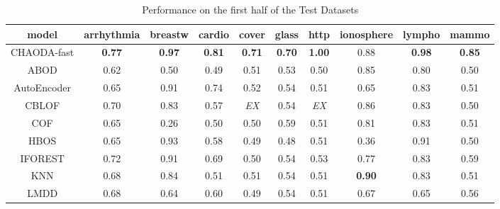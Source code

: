 \begin{table*}[!t]
\renewcommand{\arraystretch}{1.25}
\caption{Performance on the first half of the Test Datasets}
\label{table:results:test-performance-1}
\centering
\begin{tabular}{|c|c|c|c|c|c|c|c|c|c|}
\hline
\textbf{model} & \textbf{arrhythmia} & \textbf{breastw} & \textbf{cardio} & \textbf{cover} & \textbf{glass} & \textbf{http} & \textbf{ionosphere} & \textbf{lympho} & \textbf{mammo} \\
\hline
    CHAODA-fast &       \textbf{0.77} &    \textbf{0.97} &   \textbf{0.81} &  \textbf{0.71} &  \textbf{0.70} & \textbf{1.00} &                0.88 &   \textbf{0.98} &  \textbf{0.85} \\
\hline
            ABOD &                0.62 &             0.50 &            0.49 &           0.51 &           0.53 &          0.50 &                0.85 &            0.80 &           0.50 \\
\hline
    AutoEncoder &                0.65 &             0.91 &            0.74 &           0.52 &           0.54 &          0.51 &                0.65 &            0.83 &           0.51 \\
\hline
            CBLOF &                0.70 &             0.83 &            0.57 &    \textit{EX} &           0.54 &   \textit{EX} &                0.86 &            0.83 &           0.50 \\
\hline
            COF &                0.65 &             0.26 &            0.50 &           0.50 &           0.59 &          0.51 &                0.81 &            0.83 &           0.51 \\
\hline
            HBOS &                0.65 &             0.93 &            0.58 &           0.49 &           0.48 &          0.51 &                0.36 &            0.91 &           0.50 \\
\hline
        IFOREST &                0.72 &             0.91 &            0.69 &           0.50 &           0.54 &          0.53 &                0.77 &            0.83 &           0.59 \\
\hline
            KNN &                0.68 &             0.84 &            0.51 &           0.51 &           0.54 &          0.51 &       \textbf{0.90} &            0.83 &           0.51 \\
\hline
            LMDD &                0.68 &             0.64 &            0.60 &           0.49 &           0.54 &          0.51 &                0.67 &            0.65 &           0.56 \\

\end{tabular}
\end{table*}

